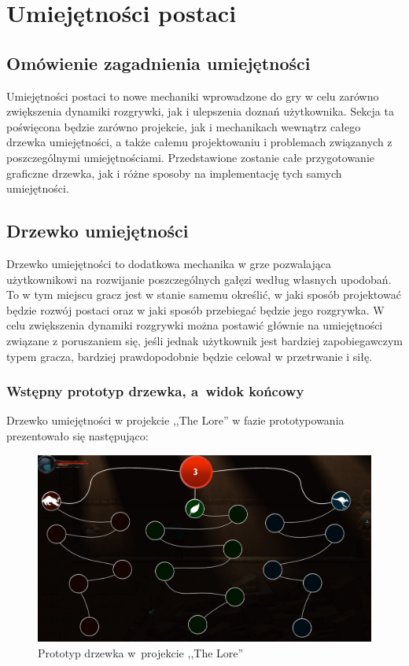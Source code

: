 \documentclass[oneside,polski,logo]{amuthesis}
\begin{document}
\section{Umiejętności postaci}
\subsection{Omówienie zagadnienia umiejętności}
Umiejętności postaci to nowe mechaniki wprowadzone do gry w celu zarówno zwiększenia dynamiki rozgrywki, jak i ulepszenia doznań użytkownika. Sekcja ta poświęcona będzie zarówno projekcie, jak i mechanikach wewnątrz całego drzewka umiejętności, a także całemu projektowaniu i problemach związanych z poszczególnymi umiejętnościami. Przedstawione zostanie całe przygotowanie graficzne drzewka, jak i różne sposoby na implementację tych samych umiejętności.

\subsection{Drzewko umiejętności}
Drzewko umiejętności to dodatkowa mechanika w grze pozwalająca użytkownikowi na rozwijanie poszczególnych gałęzi według własnych upodobań. To w tym miejscu gracz jest w stanie samemu określić, w jaki sposób projektować będzie rozwój postaci oraz w jaki sposób przebiegać będzie jego rozgrywka. W celu zwiększenia dynamiki rozgrywki można postawić głównie na umiejętności związane z poruszaniem się, jeśli jednak użytkownik jest bardziej zapobiegawczym typem gracza, bardziej prawdopodobnie będzie celował w przetrwanie i siłę.
\subsubsection{Wstępny prototyp drzewka, a~widok końcowy}
Drzewko umiejętności w projekcie ,,The Lore'' w fazie prototypowania prezentowało się następująco:


\begin{figure}[h]
	\centering
	\includegraphics[width=13cm]{images/kozubal/drzewkoPrototyp.jpg}
	\caption{Prototyp drzewka w~projekcie ,,The Lore''}
\end{figure}
\end{document}
